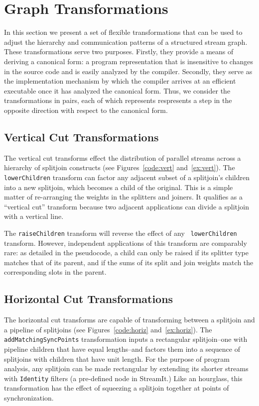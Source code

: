 
\section{Graph Transformations}

In this section we present a set of flexible transformations that can
be used to adjust the hierarchy and communication patterns of a
structured stream graph.  These transformations serve two purposes.
Firstly, they provide a means of deriving a canonical form: a program
representation that is insensitive to changes in the source code and
is easily analyzed by the compiler.  Secondly, they serve as the
implementation mechanism by which the compiler arrives at an efficient
executable once it has analyzed the canonical form.  Thus, we consider
the transformations in pairs, each of which represents respresents a
step in the opposite direction with respect to the canonical form.

\subsection{Vertical Cut Transformations}

The vertical cut transforms effect the distribution of parallel
streams across a hierarchy of splitjoin constructs (see
Figures~\ref{code:vert} and~\ref{ex:vert}).  The {\tt lowerChildren}
transform can factor any adjacent subset of a splitjoin's children
into a new splitjoin, which becomes a child of the original.  This is
a simple matter of re-arranging the weights in the splitters and
joiners.  It qualifies as a ``vertical cut'' transform because two
adjacent applications can divide a splitjoin with a vertical line.

The {\tt raiseChildren} transform will reverse the effect of any {\tt
lowerChildren} transform.  However, independent applications of this
transform are comparably rare: as detailed in the pseudocode, a child
can only be raised if its splitter type matches that of its parent,
and if the sums of its split and join weights match the corresponding
slots in the parent.

\subsection{Horizontal Cut Transformations}

The horizontal cut transforms are capable of transforming between a
splitjoin and a pipeline of splitjoins (see Figures~\ref{code:horiz}
and~\ref{ex:horiz}).  The {\tt addMatchingSyncPoints} transformation
inputs a rectangular splitjoin--one with pipeline children that have
equal lengths--and factors them into a sequence of splitjoins with
children that have unit length.  For the purpose of program analysis,
any splitjoin can be made rectangular by extending its shorter streams
with {\tt Identity} filters (a pre-defined node in StreamIt.)  Like an
hourglass, this transformation has the effect of squeezing a splitjoin
together at points of synchronization.

